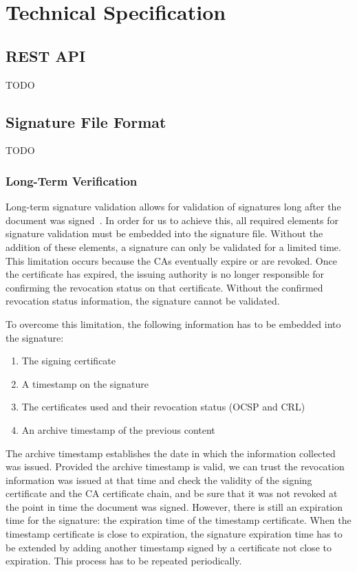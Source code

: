 \chapter{Technical Specification}
\section{REST API}
TODO
\section{Signature File Format}
TODO
\subsection{Long-Term Verification}
Long-term signature validation allows for validation of signatures long after the document was signed~\cite{etsipades}.
In order for us to achieve this, all required elements for signature validation must be embedded into the signature file.
Without the addition of these elements, a signature can only be validated for a limited time.
This limitation occurs because the \gls{CA}s eventually expire or are revoked.
Once the  certificate has expired, the issuing authority is no longer responsible for confirming the revocation status on that certificate.
Without the confirmed revocation status information, the signature cannot be validated.

To overcome this limitation, the following information has to be embedded into the signature:
\begin{enumerate}
    \item The signing certificate
    \item A timestamp on the signature
    \item The certificates used and their revocation status (\gls{OCSP} and \gls{CRL})
    \item An archive timestamp of the previous content
\end{enumerate}

The archive timestamp establishes the date in which the information collected was issued.
Provided the archive timestamp is valid,
we can trust the revocation information was issued at that time and check the validity of the signing certificate and the \gls{CA} certificate chain,
and be sure that it was not revoked at the point in time the document was signed.
However, there is still an expiration time for the signature: the expiration time of the timestamp certificate.
When the timestamp certificate is close to expiration, the signature expiration time has to be extended by adding another timestamp signed by a certificate not close to expiration.
This process has to be repeated periodically.

